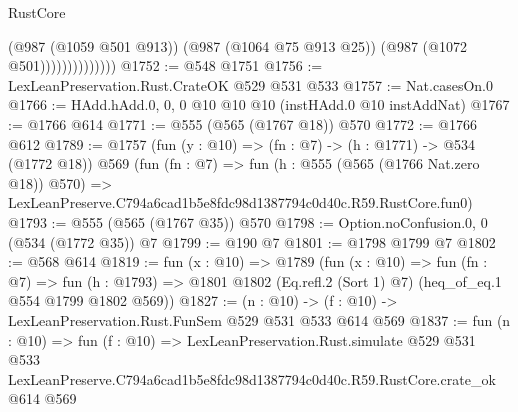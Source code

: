 \begin{lexlean}{RustCore}
\begin{coremodule}
                            (@987 (@1059 @501 @913))
                            (@987 (@1064 @75 @913 @25))
                            (@987 (@1072 @501))))))))))))))
@1752 := @548 @1751
@1756 := LexLeanPreservation.Rust.CrateOK @529 @531 @533
@1757 := Nat.casesOn.{0}
@1766 := HAdd.hAdd.{0, 0, 0} @10 @10 @10 (instHAdd.{0} @10 instAddNat)
@1767 := @1766 @614
@1771 := @555 (@565 (@1767 @18)) @570
@1772 := @1766 @612
@1789 := @1757
    (fun (y : @10) => (fn : @7) -> (h : @1771) -> @534 (@1772 @18))
    @569
    (fun (fn : @7) =>
    fun (h : @555 (@565 (@1766 Nat.zero @18)) @570) =>
    LexLeanPreserve.C794a6cad1b5e8fdc98d1387794c0d40c.R59.RustCore.fun0)
@1793 := @555 (@565 (@1767 @35)) @570
@1798 := Option.noConfusion.{0, 0} (@534 (@1772 @35)) @7
@1799 := @190 @7
@1801 := @1798 @1799 @7
@1802 := @568 @614
@1819 := fun (x : @10) =>
  @1789
    (fun (x : @10) =>
    fun (fn : @7) =>
    fun (h : @1793) => @1801 @1802 (Eq.refl.{2} (Sort 1) @7) (heq_of_eq.{1} @554 @1799 @1802 @569))
@1827 := (n : @10) -> (f : @10) -> LexLeanPreservation.Rust.FunSem @529 @531 @533 @614 @569
@1837 := fun (n : @10) =>
  fun (f : @10) =>
  LexLeanPreservation.Rust.simulate
    @529
    @531
    @533
    LexLeanPreserve.C794a6cad1b5e8fdc98d1387794c0d40c.R59.RustCore.crate_ok
    @614
    @569
\end{coremodule}
\end{lexlean}
